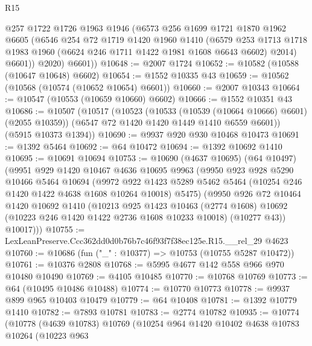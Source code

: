 \begin{lexlean}{R15}
\begin{coremodule}
          @257
          @1722
          @1726
          @1963
          @1946
          (@6573
            @256
            @1699
            @1721
            @1870
            @1962
            @6605
            (@6546
              @254
              @72
              @1719
              @1420
              @1960
              @1410
              (@6579
                @253
                @1713
                @1718
                @1983
                @1960
                (@6624 @246 @1711 @1422 @1981 @1608 @6643 @6602)
                @2014)
              @6601))
          @2020)
        @6601))
@10648 := @2007 @1724
@10652 := @10582 (@10588 (@10647 @10648) @6602)
@10654 := @1552 @10335 @43
@10659 := @10562 (@10568 (@10574 (@10652 @10654) @6601))
@10660 := @2007 @10343
@10664 := @10547 (@10553 (@10659 @10660) @6602)
@10666 := @1552 @10351 @43
@10686 := @10507
    (@10517
      (@10523
        (@10533 (@10539 (@10664 @10666) @6601) (@2055 @10359))
        (@6547 @72 @1420 @1420 @1449 @1410 @6559 @6601))
      (@5915 @10373 @1394))
@10690 := @9937 @920 @930 @10468 @10473
@10691 := @1392 @5464
@10692 := @64 @10472
@10694 := @1392 @10692 @1410
@10695 := @10691 @10694
@10753 := @10690
    (@4637 @10695)
    (@64 @10497)
    (@9951
      @929
      @1420
      @10467
      @4636
      @10695
      @9963
      (@9950
        @923
        @928
        @5290
        @10466
        @5464
        @10694
        (@9972
          @922
          @1423
          @5289
          @5462
          @5464
          (@10254 @246 @1420 @1422 @4638 @1608 @10264 @10018)
          @5475)
        (@9950
          @926
          @72
          @10464
          @1420
          @10692
          @1410
          (@10213
            @925
            @1423
            @10463
            (@2774 @1608)
            @10692
            (@10223 @246 @1420 @1422 @2736 @1608 @10233 @10018)
            (@10277 @43))
          @10017)))
@10755 := LexLeanPreserve.Ccc362dd0d0b76b7c46f93f7f38ec125e.R15.__rel_29 @4623
@10760 := @10686 (fun ("_" : @10377) => @10753 (@10755 @5287 @10472))
@10761 := @10376 @2808
@10768 := @5995 @4677 @142 @558 @966 @970 @10480 @10490
@10769 := @4105 @10485
@10770 := @10768 @10769
@10773 := @64 (@10495 @10486 @10488)
@10774 := @10770 @10773
@10778 := @9937 @899 @965 @10403 @10479
@10779 := @64 @10408
@10781 := @1392 @10779 @1410
@10782 := @7893 @10781
@10783 := @2774 @10782
@10935 := @10774
    (@10778
      (@4639 @10783)
      @10769
      (@10254
        @964
        @1420
        @10402
        @4638
        @10783
        @10264
        (@10223
          @963

\end{coremodule}
\end{lexlean}
